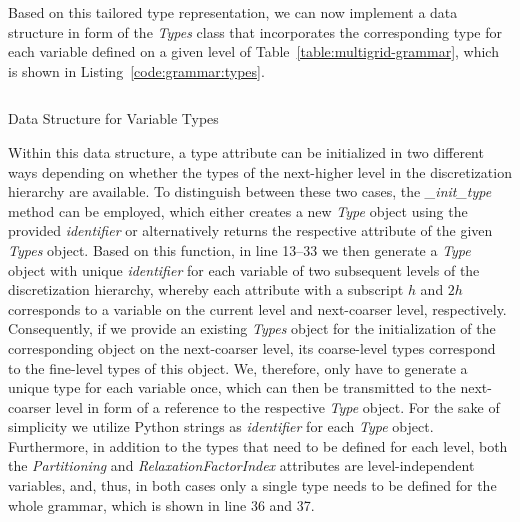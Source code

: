 Based on this tailored type representation, we can now implement a data structure in form of the \emph{Types} class that incorporates the corresponding type for each variable defined on a given level of Table~\ref{table:multigrid-grammar}, which is shown in Listing~\ref{code:grammar:types}.
\begin{listing}
  	\inputminted[linenos]{python}{evostencils/grammar/types.py}
  	\caption{Data Structure for Variable Types}
  	\label{code:grammar:types}
\end{listing}
Within this data structure, a type attribute can be initialized in two different ways depending on whether the types of the next-higher level in the discretization hierarchy are available.
To distinguish between these two cases, the \emph{\_init\_type} method can be employed, which either creates a new \emph{Type} object using the provided \emph{identifier} or alternatively returns the respective attribute of the given \emph{Types} object.
Based on this function, in line 13--33 we then generate a \emph{Type} object with unique \emph{identifier} for each variable of two subsequent levels of the discretization hierarchy, whereby each attribute with a subscript $h$ and $2h$ corresponds to a variable on the current level and next-coarser level, respectively.
Consequently, if we provide an existing \emph{Types} object for the initialization of the corresponding object on the next-coarser level, its coarse-level types correspond to the fine-level types of this object.
We, therefore, only have to generate a unique type for each variable once, which can then be transmitted to the next-coarser level in form of a reference to the respective \emph{Type} object.
For the sake of simplicity we utilize Python strings as \emph{identifier} for each \emph{Type} object. 
Furthermore, in addition to the types that need to be defined for each level, both the \emph{Partitioning} and \emph{RelaxationFactorIndex} attributes are level-independent variables, and, thus, in both cases only a single type needs to be defined for the whole grammar, which is shown in line 36 and 37.


